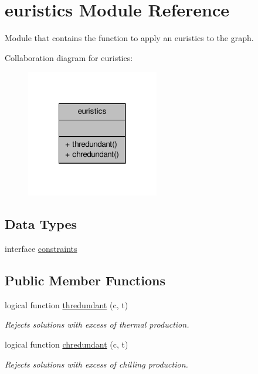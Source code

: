 \hypertarget{classeuristics}{\section{euristics Module Reference}
\label{classeuristics}
}


Module that contains the function to apply an euristics to the graph.  




Collaboration diagram for euristics\-:\nopagebreak
\begin{figure}[H]
\begin{center}
\leavevmode
\includegraphics[width=164pt]{classeuristics__coll__graph}
\end{center}
\end{figure}
\subsection*{Data Types}
\begin{DoxyCompactItemize}
\item 
interface \hyperlink{interfaceeuristics_1_1constraints}{constraints}
\end{DoxyCompactItemize}
\subsection*{Public Member Functions}
\begin{DoxyCompactItemize}
\item 
logical function \hyperlink{classeuristics_a1fea2abd84fede7cc3905d9983e374e0}{thredundant} (c, t)
\begin{DoxyCompactList}\small\item\em Rejects solutions with excess of thermal production. \end{DoxyCompactList}\item 
logical function \hyperlink{classeuristics_ab4b148eaf23e6a4fd686423477b8ee82}{chredundant} (c, t)
\begin{DoxyCompactList}\small\item\em Rejects solutions with excess of chilling production. \end{DoxyCompactList}\end{DoxyCompactItemize}


